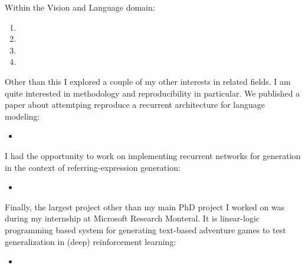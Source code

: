 Within the Vision and Language domain:

\begin{enumerate}
\item {}
\item {}
\item {}
\item {}
\end{enumerate}

Other than this I explored a couple of my other interests in
related fields. I am quite interested in methodology and reproducibility
in particular. We published a paper about attemtping reproduce a 
recurrent architecture for language modeling:

\begin{itemize}
\item {}
\end{itemize}

I had the opportunity to work on implementing recurrent networks for
generation in the context of referring-expression generation:

\begin{itemize}
\item {}
\end{itemize}

Finally, the largest project other than my main PhD project I worked
on was during my internship at Microsoft Research Monteral.
It is linear-logic programming based system for 
generating text-based adventure games to test
generalization in (deep) reinforcement learning:

\begin{itemize}
\item {}
\end{itemize}





